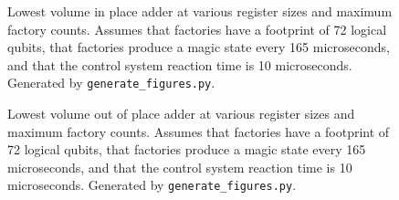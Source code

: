 \documentclass[onecolumn,unpublished]{quantumarticle}
\theoremstyle{definition}
\theoremstyle{definition}
\theoremstyle{definition}
\begin{document}
\begin{figure}
    \centering
    \caption{
        Lowest volume in place adder at various register sizes and maximum factory counts.
        Assumes that factories have a footprint of 72 logical qubits, that factories produce a magic state every 165 microseconds, and that the control system reaction time is 10 microseconds.
        Generated by \texttt{generate\_figures.py}.
    }
    \label{fig:minif}
\end{figure}

\begin{figure}
    \centering
    \caption{
        Lowest volume out of place adder at various register sizes and maximum factory counts.
        Assumes that factories have a footprint of 72 logical qubits, that factories produce a magic state every 165 microseconds, and that the control system reaction time is 10 microseconds.
        Generated by \texttt{generate\_figures.py}.
    }
    \label{fig:minof}
\end{figure}
\end{document}
